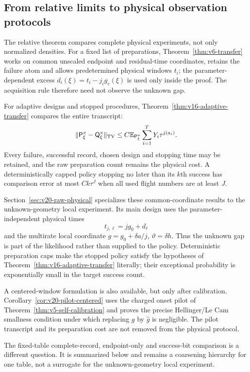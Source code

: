 \subsection{From relative limits to physical observation protocols}
The relative theorem compares complete physical experiments, not only
normalized densities.  For a fixed list of preparations,
Theorem~\ref{thm:v6-transfer} works on common unscaled endpoint and
residual-time coordinates, retains the failure atom and allows predetermined
physical windows $t_i$; the parameter-dependent excess
$d_i(\xi)=t_i-j_i g_e(\xi)$ is used only inside the proof.  The acquisition
rule therefore need not observe the unknown gap.

For adaptive designs and stopped procedures,
Theorem~\ref{thm:v16-adaptive-transfer} compares the entire transcript:
\[
 \|\mathsf P_\xi^\pi-\mathsf Q_\xi^\pi\|_{\rm TV}
 \le C\mathbb E_{\mathsf P_\xi^\pi}
                 \sum_{i=1}^{T}Y_i\tau^{j(a_i)}.
\]
Every failure, successful record, chosen design and stopping time may be
retained, and the raw preparation count remains the physical cost.  A
deterministically capped policy stopping no later than its $k$th success has
comparison error at most $Ck\tau^J$ when all used flight numbers are at
least $J$.

Section~\ref{sec:v20-raw-physical} specializes these common-coordinate
results to the unknown-geometry local experiment.  Its main design uses the
parameter-independent physical times
\[
 t_{j,\ell}=jg_0+d_\ell
\]
and the multirate local coordinate
$g=g_0+\delta a/j$, $\vartheta=\delta h$.  Thus the unknown gap is part of
the likelihood rather than supplied to the policy.  Deterministic preparation
caps make the stopped policy satisfy the hypotheses of
Theorem~\ref{thm:v16-adaptive-transfer} literally; their exceptional
probability is exponentially small in the target success count.

A centered-window formulation is also available, but only after calibration.
Corollary~\ref{cor:v20-pilot-centered} uses the charged onset pilot of
Theorem~\ref{thm:v5-self-calibration} and proves the precise Hellinger/Le Cam
smallness condition under which replacing $g$ by $\widehat g$ is negligible.
The pilot transcript and its preparation cost are not removed from the
physical protocol.

The fixed-table complete-record, endpoint-only and success-bit comparison is a
different question.  It is summarized below and remains a coarsening hierarchy
for one table, not a surrogate for the unknown-geometry local experiment.
